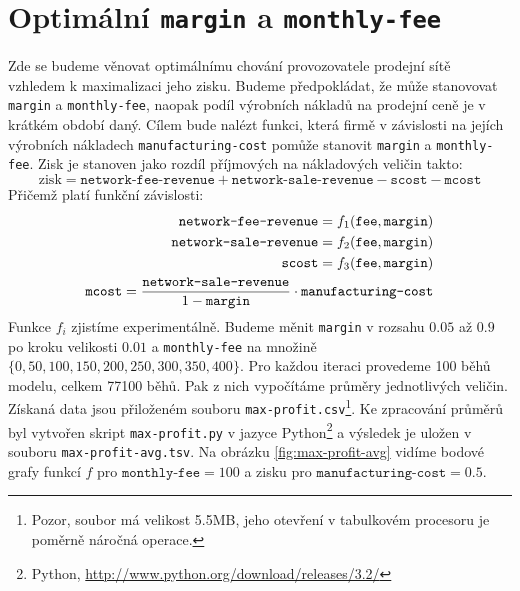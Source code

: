 \documentclass[a4wide,12pt]{report}
\begin{document}
\section{Optimální \texttt{margin} a \texttt{monthly-fee}}
Zde se budeme věnovat optimálnímu chování provozovatele prodejní sítě vzhledem k maximalizaci jeho zisku. Budeme předpokládat, že může stanovovat \texttt{margin} a \texttt{monthly-fee}, naopak podíl výrobních nákladů na prodejní ceně je v krátkém období daný. Cílem bude nalézt funkci, která firmě v závislosti na jejích výrobních nákladech \texttt{manufacturing-cost} pomůže stanovit \texttt{margin} a \texttt{monthly-fee}. Zisk je stanoven jako rozdíl příjmových na nákladových veličin takto:
\[ \text{zisk}=\texttt{network-fee-revenue}+\texttt{network-sale-revenue}-\texttt{scost}-\texttt{mcost} \]
Přičemž platí funkční závislosti:
\begin{align}
\texttt{network-fee-revenue}=f_1(\texttt{fee},\texttt{margin})\notag\\
\texttt{network-sale-revenue}=f_2(\texttt{fee},\texttt{margin})\notag\\
\texttt{scost}=f_3(\texttt{fee},\texttt{margin})\notag\\
\texttt{mcost}=\frac{\texttt{network-sale-revenue}}{1-\texttt{margin}}\cdot\texttt{manufacturing-cost}\notag
\end{align}
Funkce $f_i$ zjistíme experimentálně. Budeme měnit \texttt{margin} v rozsahu $0.05$ až $0.9$ po kroku velikosti $0.01$ a \texttt{monthly-fee} na množině $\{0,50,100,150,200,250,300,350,400\}$. Pro každou iteraci provedeme 100 běhů modelu, celkem 77100 běhů. Pak z nich vypočítáme průměry jednotlivých veličin. Získaná data jsou přiloženém souboru \texttt{max-profit.csv}\footnote{Pozor, soubor má velikost 5.5MB, jeho otevření v tabulkovém procesoru je poměrně náročná operace.}. Ke zpracování průměrů byl vytvořen skript \texttt{max-profit.py} v jazyce Python\footnote{Python, \url{http://www.python.org/download/releases/3.2/}} a výsledek je uložen v souboru \texttt{max-profit-avg.tsv}. Na obrázku \ref{fig:max-profit-avg} vidíme bodové grafy funkcí $f$ pro $\texttt{monthly-fee}=100$ a zisku pro $\texttt{manufacturing-cost}=0.5$. 
\end{document}
